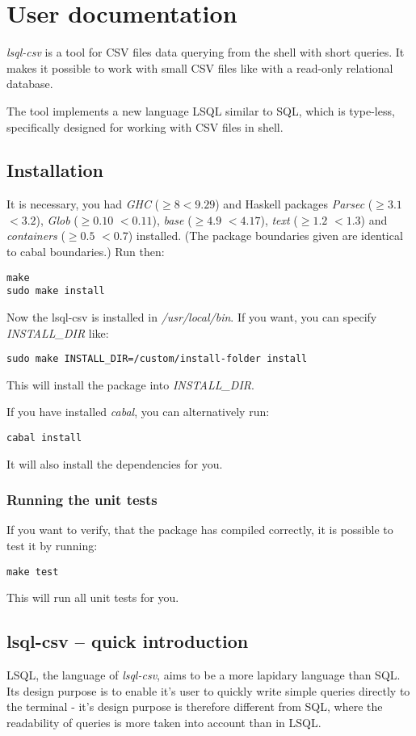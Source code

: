 \chapter{User documentation}
\textit{lsql-csv} is a tool for CSV files data querying from the shell with short queries. It makes it possible to work with small CSV files like with a read-only relational database.

The tool implements a new language LSQL similar to SQL, which is type-less, specifically designed for working with CSV files in shell. 

\section{Installation}
It is necessary, you had \textit{GHC} ($\geq 8 <9.29$) and Haskell packages \textit{Parsec} ($\geq 3.1$ $<3.2$), \textit{Glob} ($\geq 0.10$ $<0.11$), 
\textit{base} ($\geq 4.9$ $<4.17$), \textit{text} ($\geq 1.2$ $<1.3$) and \textit{containers} ($\geq 0.5$ $<0.7$)
 installed. (The package boundaries given are identical to cabal boundaries.) Run then:

\begin{verbatim}
make
sudo make install
\end{verbatim}

Now the lsql-csv is installed in \textit{/usr/local/bin}. If you want, you can specify \textit{INSTALL\_DIR} like:
\begin{verbatim}
sudo make INSTALL_DIR=/custom/install-folder install
\end{verbatim}
This will install the package into \textit{INSTALL\_DIR}.

If you have installed \textit{cabal}, you can alternatively run:
\begin{verbatim}
cabal install
\end{verbatim}
It will also install the dependencies for you.

\subsection{Running the unit tests}
If you want to verify, that the package has compiled correctly, it is possible to test it by running:
\begin{verbatim}
make test
\end{verbatim}
This will run all unit tests for you.

\section{lsql-csv -- quick introduction}
LSQL, the language of \textit{lsql-csv}, aims to be a more lapidary language than SQL. Its design purpose is to enable it's user to quickly write simple queries directly to the terminal - it's design purpose is therefore different from SQL, where the readability of queries is more taken into account than in LSQL.

